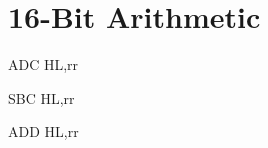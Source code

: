 \section{16-Bit Arithmetic}

\begin{minipage}{\textwidth}

\begin{instrtable}

    \begin{instruction}{ADC HL,rr} 
            \FlagsADCrr
        \SkipToOpCode
    \end{instruction}

    \begin{instruction}{SBC HL,rr} 
            \FlagsSBCrr
        \SkipToOpCode
    \end{instruction}

    \begin{instruction}{ADD HL,rr} 
            \FlagsADDrr
    \end{instruction}


\end{instrtable}
\end{minipage}
